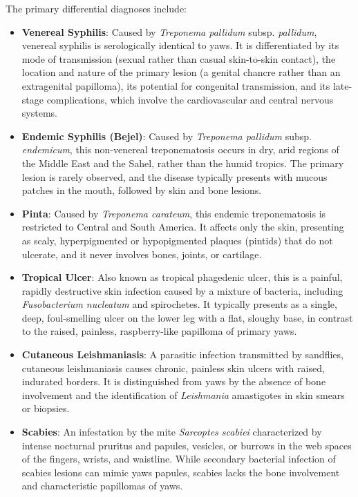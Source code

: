 The primary differential diagnoses include:
\begin{itemize}
    \item \textbf{Venereal Syphilis}: Caused by \textit{Treponema pallidum} subsp. \textit{pallidum}, venereal syphilis is serologically identical to yaws. It is differentiated by its mode of transmission (sexual rather than casual skin-to-skin contact), the location and nature of the primary lesion (a genital chancre rather than an extragenital papilloma), its potential for congenital transmission, and its late-stage complications, which involve the cardiovascular and central nervous systems.
    \item \textbf{Endemic Syphilis (Bejel)}: Caused by \textit{Treponema pallidum} subsp. \textit{endemicum}, this non-venereal treponematosis occurs in dry, arid regions of the Middle East and the Sahel, rather than the humid tropics. The primary lesion is rarely observed, and the disease typically presents with mucous patches in the mouth, followed by skin and bone lesions.
    \item \textbf{Pinta}: Caused by \textit{Treponema carateum}, this endemic treponematosis is restricted to Central and South America. It affects only the skin, presenting as scaly, hyperpigmented or hypopigmented plaques (pintids) that do not ulcerate, and it never involves bones, joints, or cartilage.
    \item \textbf{Tropical Ulcer}: Also known as tropical phagedenic ulcer, this is a painful, rapidly destructive skin infection caused by a mixture of bacteria, including \textit{Fusobacterium nucleatum} and spirochetes. It typically presents as a single, deep, foul-smelling ulcer on the lower leg with a flat, sloughy base, in contrast to the raised, painless, raspberry-like papilloma of primary yaws.
    \item \textbf{Cutaneous Leishmaniasis}: A parasitic infection transmitted by sandflies, cutaneous leishmaniasis causes chronic, painless skin ulcers with raised, indurated borders. It is distinguished from yaws by the absence of bone involvement and the identification of \textit{Leishmania} amastigotes in skin smears or biopsies.
    \item \textbf{Scabies}: An infestation by the mite \textit{Sarcoptes scabiei} characterized by intense nocturnal pruritus and papules, vesicles, or burrows in the web spaces of the fingers, wrists, and waistline. While secondary bacterial infection of scabies lesions can mimic yaws papules, scabies lacks the bone involvement and characteristic papillomas of yaws.

\end{itemize}
